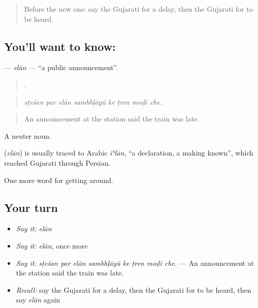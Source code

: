 \label{lesson:GU-C399-elan}



\begin{quote}
Before the new one: say the Gujarati for a delay, then the Gujarati for to be heard.
\end{quote}

\subsection*{You'll want to know: }
\textbf{} — \emph{elān} — \textquotedblleft{}a public announcement\textquotedblright{}.

\begin{quote}
       .
\end{quote}

\begin{quote}
\emph{sṭeśan par elān sambhḷāyũ ke ṭren moḍī che.}
\end{quote}

\begin{quote}
An announcement at the station said the train was late.
\end{quote}

A neuter noun.

\begin{cousinweb}
\textbf{} (\emph{elān}) is usually traced to Arabic \emph{iʿlān}, \textquotedblleft{}a declaration, a making known\textquotedblright{}, which reached Gujarati through Persian.
\end{cousinweb}

\begin{grammarlens}[title={What you've built}]
One more word for getting around.
\end{grammarlens}

\subsection*{Your turn}
\begin{itemize}
\raggedright
  \item \emph{Say it:} \emph{elān}
  \item \emph{Say it:} \emph{elān}, once more
  \item \emph{Say it:} \emph{sṭeśan par elān sambhḷāyũ ke ṭren moḍī che.} — An announcement at the station said the train was late.
  \item \emph{Recall:} say the Gujarati for a delay, then the Gujarati for to be heard, then say \emph{elān} again
\end{itemize}

